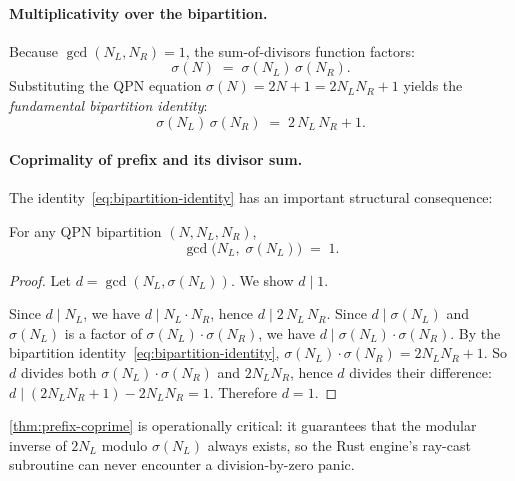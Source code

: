 \paragraph{Multiplicativity over the bipartition.}
Because $\gcd(N_L, N_R) = 1$, the sum-of-divisors function factors:
\begin{equation}\label{eq:sigma-bipartition}
  \sigma(N) \;=\; \sigma(N_L)\,\sigma(N_R).
\end{equation}
Substituting the QPN equation $\sigma(N) = 2N + 1 = 2 N_L N_R + 1$ yields
the \emph{fundamental bipartition identity}:
\begin{equation}\label{eq:bipartition-identity}
  \sigma(N_L)\,\sigma(N_R) \;=\; 2\,N_L\,N_R + 1.
\end{equation}

\paragraph{Coprimality of prefix and its divisor sum.}
The identity~\eqref{eq:bipartition-identity} has an important structural
consequence:

\begin{theorem}\label{thm:prefix-coprime}
For any QPN bipartition $(N, N_L, N_R)$,
\[
  \gcd\bigl(N_L,\;\sigma(N_L)\bigr) \;=\; 1.
\]
\end{theorem}

\begin{proof}
Let $d = \gcd(N_L, \sigma(N_L))$.  We show $d \mid 1$.

Since $d \mid N_L$, we have $d \mid N_L \cdot N_R$, hence
$d \mid 2\,N_L\,N_R$.
Since $d \mid \sigma(N_L)$ and $\sigma(N_L)$ is a factor of
$\sigma(N_L)\cdot\sigma(N_R)$, we have $d \mid \sigma(N_L)\cdot\sigma(N_R)$.
By the bipartition identity~\eqref{eq:bipartition-identity},
$\sigma(N_L)\cdot\sigma(N_R) = 2N_LN_R + 1$.
So $d$ divides both $\sigma(N_L)\cdot\sigma(N_R)$ and
$2N_LN_R$, hence $d$ divides their difference:
$d \mid (2N_LN_R+1) - 2N_LN_R = 1$.
Therefore $d = 1$.
\end{proof}

\cref{thm:prefix-coprime} is operationally critical: it guarantees that the
modular inverse of $2 N_L$ modulo $\sigma(N_L)$ always exists, so the Rust
engine's ray-cast subroutine can never encounter a division-by-zero panic.

